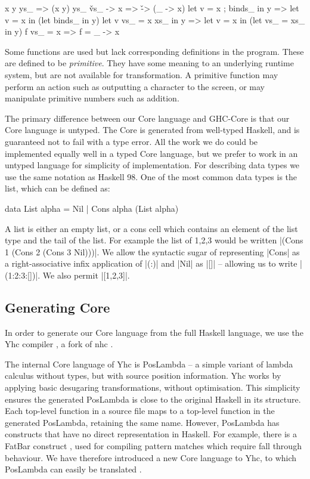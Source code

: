 \begin{code}
x y ys_                  => (x y) ys_
\v vs_ -> x              => \v -> (\vs_ -> x)
let v = x ; binds_ in y  => let v = x in (let binds_ in y)
let v vs_ = x xs_ in y   => let v = x in (let vs_ = xs_ in y)
f vs_ = x                => f = \vs_ -> x
\end{code}

Some functions are used but lack corresponding definitions in the program. These are defined to be \textit{primitive}. They have some meaning to an underlying runtime system, but are not available for transformation. A primitive function may perform an action such as outputting a character to the screen, or may manipulate primitive numbers such as addition.

The primary difference between our Core language and GHC-Core \cite{ghc_core} is that our Core language is untyped. The Core is generated from well-typed Haskell, and is guaranteed not to fail with a type error. All the work we do could be implemented equally well in a typed Core language, but we prefer to work in an untyped language for simplicity of implementation. For describing data types we use the same notation as Haskell 98. One of the most common data types is the list, which can be defined as:

\begin{code}
data List alpha = Nil | Cons alpha (List alpha)
\end{code}

A list is either an empty list, or a cons cell which contains an element of the list type and the tail of the list. For example the list of 1,2,3 would be written |(Cons 1 (Cons 2 (Cons 3 Nil)))|. We allow the syntactic sugar of representing |Cons| as a right-associative infix application of |(:)| and |Nil| as |[]| -- allowing us to write |(1:2:3:[])|. We also permit |[1,2,3]|.

\subsection{Generating Core}

In order to generate our Core language from the full Haskell language, we use the Yhc compiler \cite{yhc}, a fork of nhc \cite{nhc}.

The internal Core language of Yhc is PosLambda -- a simple variant of lambda calculus without types, but with source position information. Yhc works by applying basic desugaring transformations, without optimisation. This simplicity ensures the generated PosLambda is close to the original Haskell in its structure. Each top-level function in a source file maps to a top-level function in the generated PosLambda, retaining the same name. However, PosLambda has constructs that have no direct representation in Haskell. For example, there is a FatBar construct \cite{spj:implementation}, used for compiling pattern matches which require fall through behaviour. We have therefore introduced a new Core language to Yhc, to which PosLambda can easily be translated \cite{me:yhc_core}.

